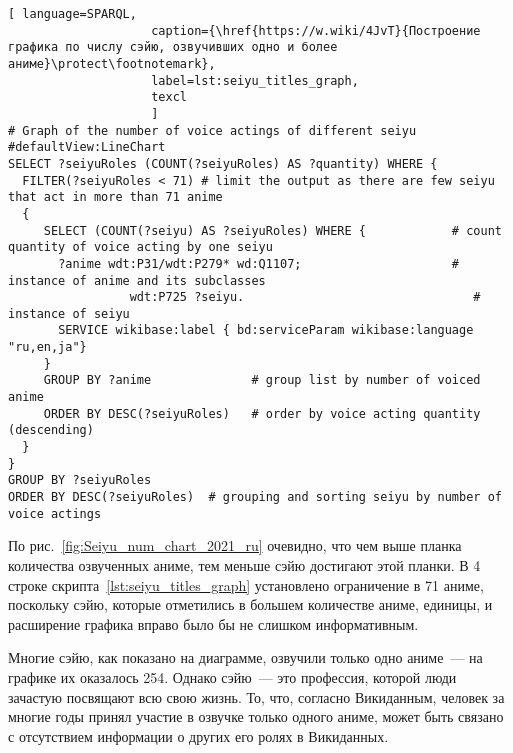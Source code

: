 \begin{fullwidth}
\lstset{numbers=left, firstnumber=1, frame=single}
\begin{lstlisting}[ language=SPARQL, 
                    caption={\href{https://w.wiki/4JvT}{Построение графика по числу сэйю, озвучивших одно и более аниме}\protect\footnotemark},
                    label=lst:seiyu_titles_graph,
                    texcl 
                    ]
# Graph of the number of voice actings of different seiyu
#defaultView:LineChart
SELECT ?seiyuRoles (COUNT(?seiyuRoles) AS ?quantity) WHERE {
  FILTER(?seiyuRoles < 71) # limit the output as there are few seiyu that act in more than 71 anime
  {
     SELECT (COUNT(?seiyu) AS ?seiyuRoles) WHERE {            # count quantity of voice acting by one seiyu
       ?anime wdt:P31/wdt:P279* wd:Q1107;                     # instance of anime and its subclasses
                 wdt:P725 ?seiyu.                                # instance of seiyu
       SERVICE wikibase:label { bd:serviceParam wikibase:language "ru,en,ja"}
     }
     GROUP BY ?anime              # group list by number of voiced anime
     ORDER BY DESC(?seiyuRoles)   # order by voice acting quantity (descending)
  }
}
GROUP BY ?seiyuRoles
ORDER BY DESC(?seiyuRoles)  # grouping and sorting seiyu by number of voice actings
\end{lstlisting}%
\lstset{numbers=none}
\end{fullwidth}

По рис.~\ref{fig:Seiyu_num_chart_2021_ru} очевидно, что чем выше планка количества озвученных аниме, тем меньше сэйю достигают этой планки. В \num{4} строке скрипта~\protect\ref{lst:seiyu_titles_graph} установлено ограничение в \num{71} аниме, поскольку сэйю, которые отметились в большем количестве аниме, единицы, и расширение графика вправо было бы не слишком информативным.

Многие сэйю, как показано на диаграмме, озвучили только одно аниме~--- на графике их оказалось \num{254}. Однако сэйю~--- это профессия, которой люди зачастую посвящают всю свою жизнь. То, что, согласно Викиданным, человек за многие годы принял участие в озвучке только одного аниме, может быть связано с отсутствием информации о других его ролях в Викиданных. 

\begin{figure*}[h]

    \setlength{\fboxsep}{0pt}%
    \setlength{\fboxrule}{1pt}%
	\caption[График числа ролей, озвученных различными сэйю, 2021.]{График числа ролей, озвученных различными сэйю, 2021. График построен на основе данных, полученных с помощью запроса~\protect\ref{lst:seiyu_titles_graph}.}%
    \label{fig:Seiyu_num_chart_2021_ru}%
\end{figure*} 

